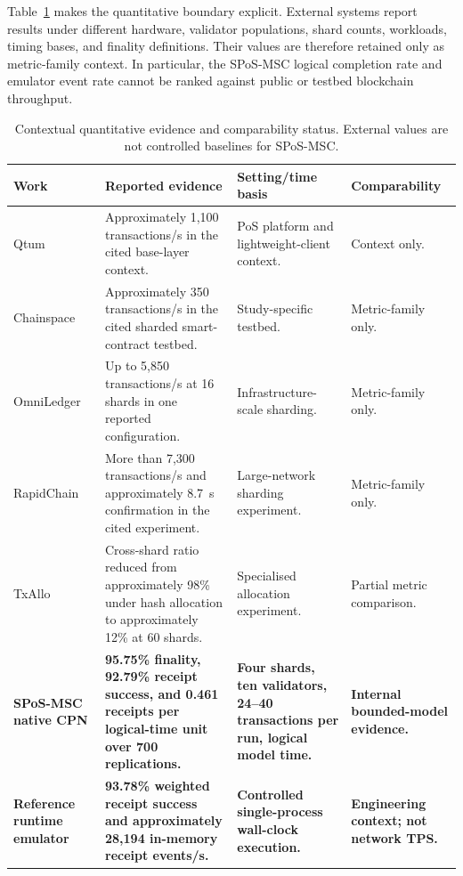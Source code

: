 \documentclass[a4paper,fleqn]{cas-sc}
\begin{document}
Table~\ref{tab:context_evidence} makes the quantitative boundary explicit.
External systems report results under different hardware, validator
populations, shard counts, workloads, timing bases, and finality definitions.
Their values are therefore retained only as metric-family context. In
particular, the SPoS-MSC logical completion rate and emulator event rate cannot
be ranked against public or testbed blockchain throughput.

\begin{table}[pos=t]
\centering
\caption{Contextual quantitative evidence and comparability status. External
values are not controlled baselines for SPoS-MSC.}
\label{tab:context_evidence}
\scriptsize
\setlength{\tabcolsep}{3.2pt}
\renewcommand{\arraystretch}{1.10}
\begin{tabularx}{\textwidth}{p{2.45cm}p{4.75cm}p{4.15cm}X}
\toprule
\textbf{Work} & \textbf{Reported evidence} & \textbf{Setting/time basis} &
\textbf{Comparability}\\
\midrule
Qtum~\cite{dai2017smart} & Approximately 1,100 transactions/s in the cited
base-layer context. & PoS platform and lightweight-client context. & Context
only.\\
Chainspace~\cite{Al-Bassam} & Approximately 350 transactions/s in the cited
sharded smart-contract testbed. & Study-specific testbed. & Metric-family only.\\
OmniLedger~\cite{Kokoris-Kogias2018} & Up to 5,850 transactions/s at 16
shards in one reported configuration. & Infrastructure-scale sharding. &
Metric-family only.\\
RapidChain~\cite{Zamani2018a} & More than 7,300 transactions/s and
approximately 8.7~s confirmation in the cited experiment. & Large-network
sharding experiment. & Metric-family only.\\
TxAllo~\cite{Zhang2023TxAllo} & Cross-shard ratio reduced from approximately
98\% under hash allocation to approximately 12\% at 60 shards. & Specialised
allocation experiment. & Partial metric comparison.\\
\textbf{SPoS-MSC native CPN} & \textbf{95.75\% finality, 92.79\% receipt
success, and 0.461 receipts per logical-time unit over 700 replications.} &
\textbf{Four shards, ten validators, 24--40 transactions per run, logical
model time.} & \textbf{Internal bounded-model evidence.}\\
\textbf{Reference runtime emulator} & \textbf{93.78\% weighted receipt
success and approximately 28,194 in-memory receipt events/s.} &
\textbf{Controlled single-process wall-clock execution.} &
\textbf{Engineering context; not network TPS.}\\
\bottomrule
\end{tabularx}
\end{table}
\end{document}
